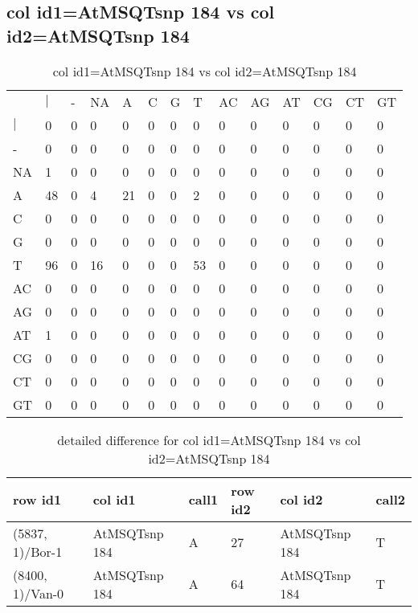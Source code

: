 \subsection{col id1=AtMSQTsnp 184 vs col id2=AtMSQTsnp 184}
\begin{center}
\begin{longtable}{|l|l|l|l|l|l|l|l|l|l|l|l|l|l|}
\caption{col id1=AtMSQTsnp 184 vs col id2=AtMSQTsnp 184} \label{table_dm552}\\
\hline
\\
\hline
&$|$&-&NA&A&C&G&T&AC&AG&AT&CG&CT&GT\\
$|$&0&0&0&0&0&0&0&0&0&0&0&0&0\\
-&0&0&0&0&0&0&0&0&0&0&0&0&0\\
NA&1&0&0&0&0&0&0&0&0&0&0&0&0\\
A&48&0&4&21&0&0&2&0&0&0&0&0&0\\
C&0&0&0&0&0&0&0&0&0&0&0&0&0\\
G&0&0&0&0&0&0&0&0&0&0&0&0&0\\
T&96&0&16&0&0&0&53&0&0&0&0&0&0\\
AC&0&0&0&0&0&0&0&0&0&0&0&0&0\\
AG&0&0&0&0&0&0&0&0&0&0&0&0&0\\
AT&1&0&0&0&0&0&0&0&0&0&0&0&0\\
CG&0&0&0&0&0&0&0&0&0&0&0&0&0\\
CT&0&0&0&0&0&0&0&0&0&0&0&0&0\\
GT&0&0&0&0&0&0&0&0&0&0&0&0&0\\
\hline
\end{longtable}
\end{center}

\begin{center}
\begin{longtable}{|l|l|l|l|l|l|}
\caption{detailed difference for col id1=AtMSQTsnp 184 vs col id2=AtMSQTsnp 184} \label{table_dm553}\\
\hline
row id1&col id1&call1&row id2&col id2&call2\\
\hline
(5837, 1)/Bor-1&AtMSQTsnp 184&A&27&AtMSQTsnp 184&T\\
(8400, 1)/Van-0&AtMSQTsnp 184&A&64&AtMSQTsnp 184&T\\
\hline
\end{longtable}
\end{center}

